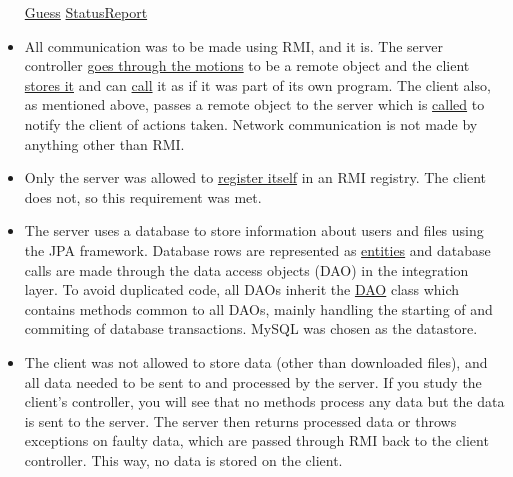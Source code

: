 \documentclass[a4paper]{scrartcl}
\begin{document}
\begin{itemize}
        \href{https://github.com/fongie/Hangman/blob/master/hangmanclient/src/main/java/DTO/Guess.java}{Guess} \href{https://github.com/fongie/Hangman/blob/master/hangmanserver/src/main/java/DTO/StatusReport.java}{StatusReport}
    
    \item All communication was to be made using RMI, and it is. The server controller \href{https://github.com/fongie/Filehandler/blob/master/filehandler_server/src/main/java/controller/ServerController.java#L18}{goes through the motions} to be a remote object and the client \href{https://github.com/fongie/Filehandler/blob/master/filehandler_client/src/main/java/controller/Controller.java#L164}{stores it} and can \href{https://github.com/fongie/Filehandler/blob/master/filehandler_client/src/main/java/controller/Controller.java#L131}{call} it as if it was part of its own program. The client also, as mentioned above, passes a remote object to the server which is \href{https://github.com/fongie/Filehandler/blob/master/filehandler_server/src/main/java/model/Client.java#L19}{called} to notify the client of actions taken. Network communication is not made by anything other than RMI.
    
    \item Only the server was allowed to \href{https://github.com/fongie/Filehandler/blob/master/filehandler_server/src/main/java/startup/StartServer.java}{register itself} in an RMI registry. The client does not, so this requirement was met.
    
    \item The server uses a database to store information about users and files using the JPA framework. Database rows are represented as \href{https://github.com/fongie/Filehandler/tree/master/filehandler_server/src/main/java/entities}{entities} and database calls are made through the data access objects (DAO) in the integration layer. To avoid duplicated code, all DAOs inherit the \href{https://github.com/fongie/Filehandler/blob/master/filehandler_server/src/main/java/integration/DAO.java}{DAO} class which contains methods common to all DAOs, mainly handling the starting of and commiting of database transactions. MySQL was chosen as the datastore.
    
    \item The client was not allowed to store data (other than downloaded files), and all data needed to be sent to and processed by the server. If you study the client's controller, you will see that no methods process any data but the data is sent to the server. The server then returns processed data or throws exceptions on faulty data, which are passed through RMI back to the client controller. This way, no data is stored on the client.
    

\end{itemize}
\end{document}
